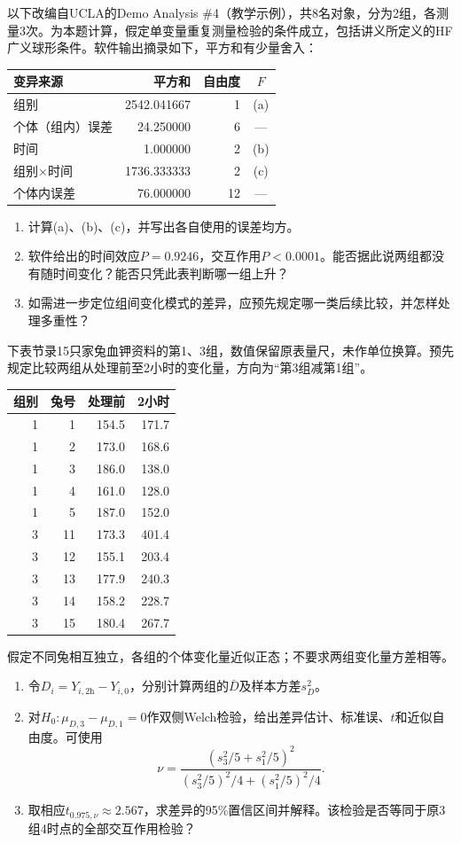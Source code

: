以下改编自UCLA的Demo Analysis \#4（教学示例），共8名对象，分为2组，各测量3次。为本题计算，假定单变量重复测量检验的条件成立，包括讲义所定义的HF广义球形条件。软件输出摘录如下，平方和有少量舍入：
\begin{center}\small\begin{tabular}{lrrc}\toprule
变异来源 & 平方和 & 自由度 & $F$\\\midrule
组别 & 2542.041667 & 1 & (a)\\
个体（组内）误差 & 24.250000 & 6 & ---\\\addlinespace
时间 & 1.000000 & 2 & (b)\\
组别$\times$时间 & 1736.333333 & 2 & (c)\\
个体内误差 & 76.000000 & 12 & ---\\\bottomrule
\end{tabular}\end{center}
\begin{enumerate}
\item 计算(a)、(b)、(c)，并写出各自使用的误差均方。
\item 软件给出的时间效应$P=0.9246$，交互作用$P<0.0001$。能否据此说两组都没有随时间变化？能否只凭此表判断哪一组上升？
\item 如需进一步定位组间变化模式的差异，应预先规定哪一类后续比较，并怎样处理多重性？
\end{enumerate}

下表节录15只家兔血钾资料的第1、3组，数值保留原表量尺，未作单位换算。预先规定比较两组从处理前至2小时的变化量，方向为“第3组减第1组”。
\begin{center}\small\begin{tabular}{rrrr}\toprule
组别 & 兔号 & 处理前 & 2小时\\\midrule
1 & 1 & 154.5 & 171.7\\
1 & 2 & 173.0 & 168.6\\
1 & 3 & 186.0 & 138.0\\
1 & 4 & 161.0 & 128.0\\
1 & 5 & 187.0 & 152.0\\
3 & 11 & 173.3 & 401.4\\
3 & 12 & 155.1 & 203.4\\
3 & 13 & 177.9 & 240.3\\
3 & 14 & 158.2 & 228.7\\
3 & 15 & 180.4 & 267.7\\\bottomrule
\end{tabular}\end{center}
假定不同兔相互独立，各组的个体变化量近似正态；不要求两组变化量方差相等。
\begin{enumerate}
\item 令$D_i=Y_{i,2\mathrm h}-Y_{i,0}$，分别计算两组的$\bar D$及样本方差$s_D^2$。
\item 对$H_0:\mu_{D,3}-\mu_{D,1}=0$作双侧Welch检验，给出差异估计、标准误、$t$和近似自由度。可使用
\[
\nu=\frac{(s_3^2/5+s_1^2/5)^2}{(s_3^2/5)^2/4+(s_1^2/5)^2/4}.
\]
\item 取相应$t_{0.975,\nu}\approx2.567$，求差异的95\%置信区间并解释。该检验是否等同于原3组4时点的全部交互作用检验？
\end{enumerate}

